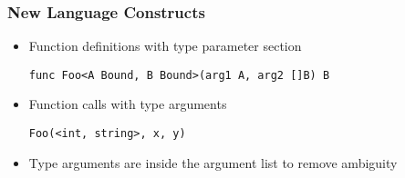 \documentclass[12pt]{beamer}
\begin{document}

\begin{frame}[fragile]
\frametitle{New Language Constructs}
\begin{itemize}
\item Function definitions with type parameter section
\begin{verbatim}
func Foo<A Bound, B Bound>(arg1 A, arg2 []B) B
\end{verbatim}
\item Function calls with type arguments
\begin{verbatim}
Foo(<int, string>, x, y)
\end{verbatim}
\item Type arguments are inside the argument list to remove ambiguity

\end{itemize}
\end{frame}




\end{document}
